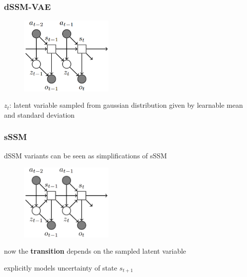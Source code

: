 \begin{frame}
	\frametitle{dSSM-VAE}
	\begin{multicols}{2}
		\begin{figure}[h]
			\includegraphics[width=0.4\textwidth]{./latent_i2a_images/dSSM_VAE_architecture.png}	
		\end{figure}
		\columnbreak
		$z_t$: latent variable sampled from gaussian distribution given by learnable mean and standard deviation
	\end{multicols}
\end{frame}


\begin{frame}
	\frametitle{sSSM}
	dSSM variants can be seen as simplifications of sSSM \\
	\begin{multicols}{2}
		\begin{figure}[h]
			\includegraphics[width=0.4\textwidth]{./latent_i2a_images/sSSM2.png}	
		\end{figure}
		\columnbreak
		\begin{PraesentationAufzaehlung}
			\item now the \textbf{transition} depends on the sampled latent variable
			\item explicitly models uncertainty of state $s_{t+1}$
		\end{PraesentationAufzaehlung}
	\end{multicols}
\end{frame}


